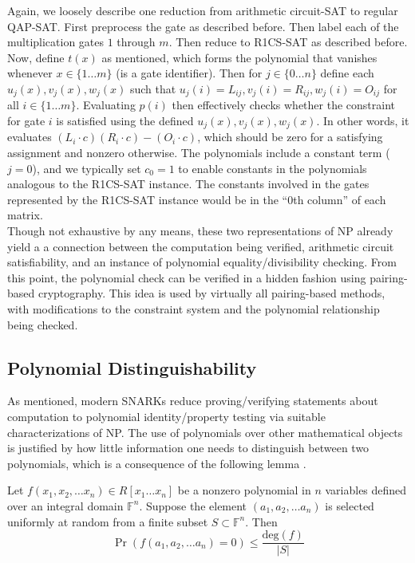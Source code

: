 \noindent Again, we loosely describe one reduction from arithmetic circuit-SAT to regular QAP-SAT. First preprocess the gate as described before. Then label each of the multiplication gates $1$ through $m$. Then reduce to R1CS-SAT as described before. Now, define $t(x)$ as mentioned, which forms the polynomial that vanishes whenever $x \in \{1 \dots m\}$ (is a gate identifier). Then for $j \in \{0 \dots n\}$ define each $u_j(x), v_j(x), w_j(x)$ such that $u_j(i) = L_{ij}, v_j(i) = R_{ij}, w_j(i) = O_{ij}$ for all $i \in \{1 \dots m\}$. Evaluating $p(i)$ then effectively checks whether the constraint for gate $i$ is satisfied using the defined $u_j(x), v_j(x), w_j(x)$. In other words, it evaluates $(L_i \cdot c) (R_i \cdot c) - (O_i \cdot c)$, which should be zero for a satisfying assignment and nonzero otherwise. The polynomials include a constant term ($j = 0$), and we typically set $c_0 = 1$ to enable constants in the polynomials analogous to the R1CS-SAT instance. The constants involved in the gates represented by the R1CS-SAT instance would be in the ``0th column'' of each matrix.\\

\noindent Though not exhaustive by any means, these two representations of NP already yield a a connection between the computation being verified, arithmetic circuit satisfiability, and an instance of polynomial equality/divisibility checking. From this point, the polynomial check can be verified in a hidden fashion using pairing-based cryptography. This idea is used by virtually all pairing-based methods, with modifications to the constraint system and the polynomial relationship being checked.

\subsection{Polynomial Distinguishability}\label{subsec:poly}
\noindent As mentioned, modern SNARKs reduce proving/verifying statements about computation to polynomial identity/property testing via suitable characterizations of NP. The use of polynomials over other mathematical objects is justified by how little information one needs to distinguish between two polynomials, which is a consequence of the following lemma \cite{schwartz}.

\begin{lemma}\label{lem:zippel}
\noindent Let $f(x_1, x_2, \dots x_n) \in R[x_1 \dots x_n]$ be a nonzero polynomial in $n$ variables defined over an integral domain $\mathbb{F}^{n}$. Suppose the element $(a_1, a_2, \dots a_n)$ is selected uniformly at random from a finite subset $S \subset \mathbb{F}^n$. Then 
$$
    \Pr(f(a_1, a_2, \dots a_n) = 0) \le \frac{\text{deg}(f)}{|S|}
$$
\end{lemma}

